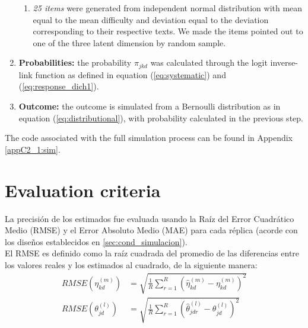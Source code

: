 \begin{enumerate}
\begin{enumerate}
		\item \textit{25 items} were generated from independent normal distribution with mean equal to the mean difficulty and deviation equal to the deviation corresponding to their respective texts. We made the items pointed out to one of the three latent dimension by random sample.
	\end{enumerate}
	\item \textbf{Probabilities:} the probability $\pi_{jkd}$ was calculated through the logit inverse-link function as defined in equation (\ref{eq:systematic}) and (\ref{eq:response_dich1}).
	
	\item \textbf{Outcome:} the outcome is simulated from a Bernoulli distribution as in equation (\ref{eq:distributional}), with probability calculated in the previous step.
\end{enumerate}

\noindent The code associated with the full simulation process can be found in Appendix \ref{appC2_1:sim}. \\




\section{Evaluation criteria}

La precisión de los estimados fue evaluada usando la Raíz del Error Cuadrático Medio (RMSE) y el Error Absoluto Medio (MAE) para cada réplica (acorde con los diseños establecidos en \ref{sec:cond_simulacion}). \\

El RMSE es definido como la raíz cuadrada del promedio de las diferencias entre los valores reales y los estimados al cuadrado, de la siguiente manera:
\begin{align}
	RMSE \left( \eta^{(m)}_{kd} \right) &=\sqrt{\frac{1}{R} \sum_{r=1}^{R} (\hat{\eta}^{(m)}_{kd} - \eta^{(m)}_{kd} )^2} \\
	RMSE \left( \theta^{(l)}_{jd} \right) &=\sqrt{\frac{1}{R} \sum_{r=1}^{R} (\hat{\theta}^{(l)}_{jdr}-\theta^{(l)}_{jd})^2}
\end{align}

